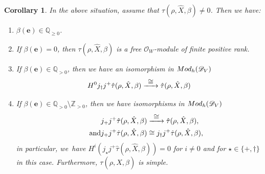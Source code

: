 \documentclass[11pt]{article}
\let\mathds\mathbb
\newcommand{\To}[1]{\mathchoice{\xrightarrow{\textstyle\kern4pt#1\kern3pt}}{\xrightarrow{\,#1\,}}{}{}}
\newcommand{\bme}{{\boldsymbol{e}}}
\newtheorem{cor}[thm]{Corollary}
\newcommand{\dQ}{{\mathds Q}}\let\Q\dQ
\newcommand{\dZ}{{\mathds Z}}\let\mbz\dZ\let\Z\dZ
\newcommand{\cD}{\mathscr{D}}
\newcommand{\cO}{\mathcal{O}}\let\O\cO
\begin{document}
\begin{cor}\label{cor:LocColocHatTau}
In the above situation, assume that $\tau(\rho,\hat{X},\beta)\neq 0$. Then we have:
\begin{enumerate}
\item $\beta(\bme)\in\dQ_{\geq 0}$.
\item
If $\beta(\bme) = 0$, then $\tau(\rho, \hat{X},\beta)$ is a free $\cO_W$\nobreakdash-mod\-ule of finite positive rank.

\item
If $\beta(\bme) \in \dQ_{>0}$, then
we have an isomorphism in $\textup{Mod}_h(\cD_V)$
\[
H^0j_\dag j^+ \hat{\tau}(\rho, \hat{X}, \beta) \To{\cong}\hat{\tau}(\rho, \hat{X}, \beta)
\]

\item
If $\beta(\bme) \in \dQ_{>0}\setminus \dZ_{>0}$, then
we have isomorphisms in $\textup{Mod}_h(\cD_V)$
\begin{align*}
j_+ j^+ \hat{\tau}(\rho, \hat{X}, \beta) &\To{\cong}\hat{\tau}(\rho, \hat{X}, \beta),
\\ \tag*{and}
j_+j^+\hat{\tau}(\rho, \hat{X}, \beta) &\cong j_\dag j^+ \hat{\tau}(\rho, \hat{X}, \beta),
\end{align*}
in particular, we~have $H^i(j_\star j^+\hat{\tau}(\rho, \hat{X}, \beta))=0$ for $i\neq 0$ and for $\star\in\{+,\dag\}$ in this case. Furthermore, $\tau(\rho,\hat{X},\beta)$ is simple.
\end{enumerate}
\end{cor}
\end{document}
